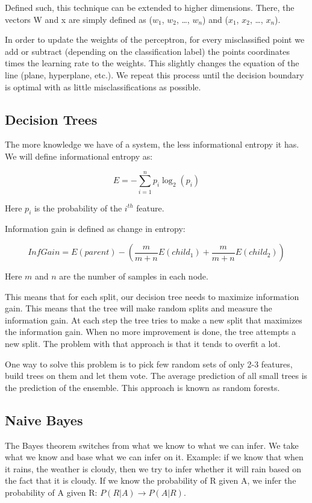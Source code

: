 \documentclass{article}
\begin{document}
Defined such, this technique can be extended to higher dimensions. There, the vectors W and x are simply defined as ($w_1$, $w_2$, …, $w_n$) and ($x_1$, $x_2$, …, $x_n$).

In order to update the weights of the perceptron, for every misclassified point we add or subtract (depending on the classification label) the points coordinates times the learning rate to the weights. This slightly changes the equation of the line (plane, hyperplane, etc.). We repeat this process until the decision boundary is optimal with as little misclassifications as possible.

\subsection{Decision Trees}
The more knowledge we have of a system, the less informational entropy it has. We will define informational entropy as:

\begin{equation}
  E = - \sum_{i = 1}^{n} p_i \log_2(p_i)
\end{equation}

Here $p_i$ is the probability of the $i^{th}$ feature.

Information gain is defined as change in entropy:

\begin{equation}
  InfGain = E(parent) - \left( \frac{m}{m + n} E(child_1) + \frac{m}{m + n} E(child_2) \right)
\end{equation}

Here $m$ and $n$ are the number of samples in each node.

This means that for each split, our decision tree needs to maximize information gain. This means that the tree will make random splits and measure the information gain. At each step the tree tries to make a new split that maximizes the information gain. When no more improvement is done, the tree attempts a new split. The problem with that approach is that it tends to overfit a lot.

One way to solve this problem is to pick few random sets of only 2-3 features, build trees on them and let them vote. The average prediction of all small trees is the prediction of the ensemble. This approach is known as random forests.

\subsection{Naive Bayes}
The Bayes theorem switches from what we know to what we can infer. We take what we know and base what we can infer on it. Example: if we know that when it rains, the weather is cloudy, then we try to infer whether it will rain based on the fact that it is cloudy. If we know the probability of R given A, we infer the probability of A given R: $P(R|A) \rightarrow P(A|R)$.
\end{document}
